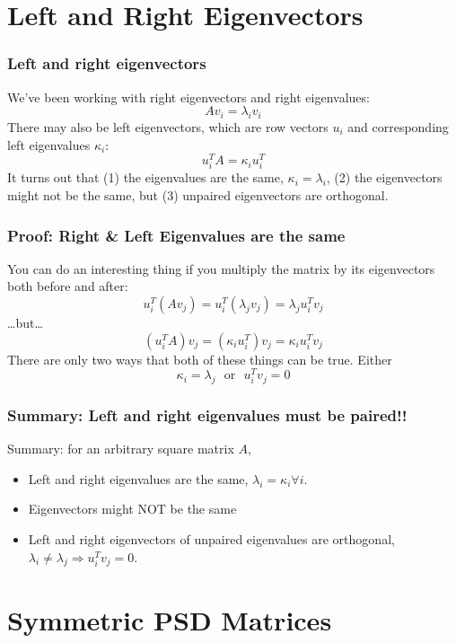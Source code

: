 \documentclass{beamer}
\begin{document}
\section[Eigenvectors]{Left and Right Eigenvectors}
\setcounter{subsection}{1}

\begin{frame}
  \frametitle{Left and right eigenvectors}
  We’ve been working with right eigenvectors and right eigenvalues: 
  \[
  A{v}_i =\lambda_i{v}_i
  \]
  There may also be left eigenvectors, which are row vectors ${u}_i$
  and corresponding left eigenvalues $\kappa_i$:
  \[
  {u}_i^T A = \kappa_i{u}_i^T
  \]
  It turns out that (1) the eigenvalues are the same,
  $\kappa_i=\lambda_i$, (2) the eigenvectors might not be the same, but
  (3) unpaired eigenvectors are orthogonal.
\end{frame}

\begin{frame}
  \frametitle{Proof: Right \& Left Eigenvalues are the same}
  You can do an interesting thing if you multiply the matrix by its eigenvectors both before and after:
  \[
  {u}_i^T(A{v}_j)={u}_i^T(\lambda_j{v}_j)=\lambda_j{u}_i^T{v}_j
  \]
  \ldots but\ldots
  \[
  ({u}_i^TA){v}_j=(\kappa_i{u}_i^T){v}_j=\kappa_i{u}_i^T{v}_j
  \]
  There are only two ways that both of these things can be true. Either
  \[
  \kappa_i=\lambda_j~~~\mbox{or}~~~{u}_i^T{v}_j=0
  \]
\end{frame}

\begin{frame}
  \frametitle{Summary: Left and right eigenvalues must be paired!!}

  Summary: for an arbitrary square matrix $A$,
  \begin{itemize}
  \item Left and right eigenvalues are the same,
    $\lambda_i=\kappa_i\forall i$.
  \item Eigenvectors might NOT be the same
  \item Left and right eigenvectors of unpaired eigenvalues are
    orthogonal, $\lambda_i\ne\lambda_j \Rightarrow u_i^Tv_j=0$.
  \end{itemize}
\end{frame}

\section[Symmetric]{Symmetric PSD Matrices}
\setcounter{subsection}{1}
\end{document}
